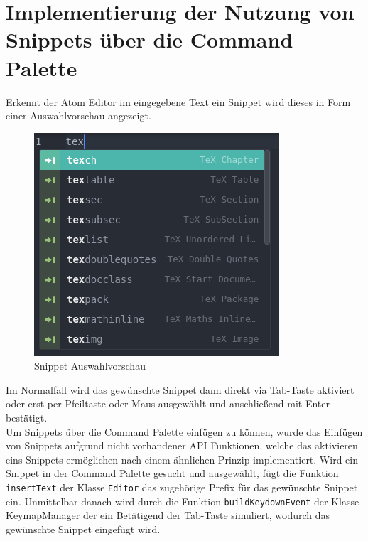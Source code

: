     \newpage
    \section{Implementierung der Nutzung von Snippets über die Command Palette}
        Erkennt der Atom Editor im eingegebene Text ein Snippet wird dieses in Form einer Auswahlvorschau angezeigt.
        \begin{figure}[H]
            \centering
            \includegraphics[scale=0.5]{img/snippet_preview.png}
            \caption{Snippet Auswahlvorschau}
        \end{figure}
        Im Normalfall wird das gewünschte Snippet dann direkt via Tab-Taste aktiviert oder erst per Pfeiltaste oder Maus ausgewählt und anschließend mit Enter bestätigt.
        \\
        Um Snippets über die Command Palette einfügen zu können, wurde das Einfügen von Snippets aufgrund nicht vorhandener API Funktionen, welche das aktivieren eins Snippets ermöglichen nach einem ähnlichen Prinzip implementiert. Wird ein Snippet in der Command Palette gesucht und ausgewählt, fügt die Funktion \texttt{insertText} der Klasse \texttt{Editor} das zugehörige Prefix für das gewünschte Snippet ein. Unmittelbar danach wird durch die Funktion \texttt{buildKeydownEvent} der Klasse KeymapManager der ein Betätigend der Tab-Taste simuliert, wodurch das gewünschte Snippet eingefügt wird.

